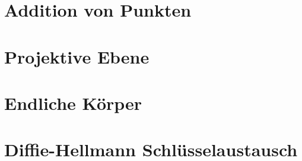 \documentclass{beamer}
\begin{document}
\section{Addition von Punkten}
\section{Projektive Ebene}
\section{Endliche Körper}
\section{Diffie-Hellmann Schlüsselaustausch}
\begin{frame}
  \tableofcontents
\end{frame}
\end{document}
